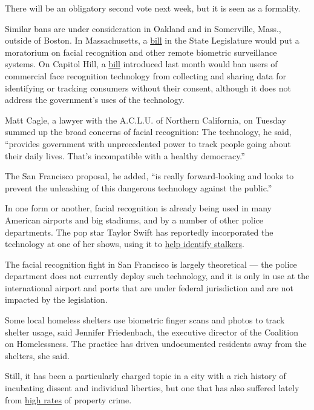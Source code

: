 There will be an obligatory second vote next week, but it is seen as a
formality.

Similar bans are under consideration in Oakland and in Somerville,
Mass., outside of Boston. In Massachusetts, a
\href{https://malegislature.gov/Bills/191/S1385}{bill} in the State
Legislature would put a moratorium on facial recognition and other
remote biometric surveillance systems. On Capitol Hill, a
\href{https://www.congress.gov/bill/116th-congress/senate-bill/847}{bill}
introduced last month would ban users of commercial face recognition
technology from collecting and sharing data for identifying or tracking
consumers without their consent, although it does not address the
government's uses of the technology.

Matt Cagle, a lawyer with the A.C.L.U. of Northern California, on
Tuesday summed up the broad concerns of facial recognition: The
technology, he said, ``provides government with unprecedented power to
track people going about their daily lives. That's incompatible with a
healthy democracy.''

The San Francisco proposal, he added, ``is really forward-looking and
looks to prevent the unleashing of this dangerous technology against the
public.''

In one form or another, facial recognition is already being used in many
American airports and big stadiums, and by a number of other police
departments. The pop star Taylor Swift has reportedly incorporated the
technology at one of her shows, using it to
\href{https://www.nytimes3xbfgragh.onion/2018/12/13/arts/music/taylor-swift-facial-recognition.html}{help
identify stalkers}.

The facial recognition fight in San Francisco is largely theoretical ---
the police department does not currently deploy such technology, and it
is only in use at the international airport and ports that are under
federal jurisdiction and are not impacted by the legislation.

Some local homeless shelters use biometric finger scans and photos to
track shelter usage, said Jennifer Friedenbach, the executive director
of the Coalition on Homelessness. The practice has driven undocumented
residents away from the shelters, she said.

Still, it has been a particularly charged topic in a city with a rich
history of incubating dissent and individual liberties, but one that has
also suffered lately from
\href{https://www.nytimes3xbfgragh.onion/2018/06/06/us/-homelessness-housing-san-francisco.html}{high
rates} of property crime.

